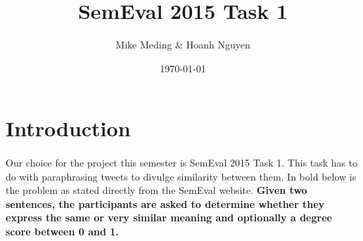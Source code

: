 \documentclass[dvips,12pt]{article}
\begin{document}

\title{SemEval 2015 Task 1}
\author{Mike Meding \& Hoanh Nguyen}
\date{\today}



\maketitle

%
%
%
%


\section{Introduction}

\paragraph{}
Our choice for the project this semester is SemEval 2015 Task 1. This task has to do with paraphrasing tweets to divulge similarity between them. In bold below is the problem as stated directly from the SemEval website.
\textbf{Given two sentences, the participants are asked to determine whether they express the same or very similar meaning and optionally a degree score between 0 and 1.}
\end{document}
